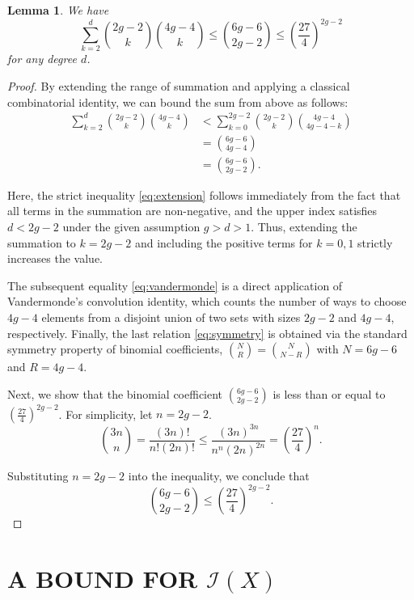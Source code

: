 \documentclass[11pt]{article}
\numberwithin{equation}{section}
\theoremstyle{plain}
\newtheorem{lemma}[theorem]{Lemma}
\begin{document}
\begin{lemma}\label{count}
We have
$$\sum_{k=2}^d \binom{2g-2}{k}\binom{4g-4}{k}\le
 \binom{6g-6}{2g-2}
 \le
\left( \frac{27}{4} \right)^{2g-2}$$
for any degree $d$.
\end{lemma}
\begin{proof}


By extending the range of summation and applying a classical combinatorial identity, we can bound the sum from above as follows:
\begin{align}
\sum_{k=2}^d \binom{2g-2}{k} \binom{4g-4}{k} 
&< \sum_{k=0}^{2g-2} \binom{2g-2}{k} \binom{4g-4}{4g-4-k} \label{eq:extension} \\
&= \binom{6g-6}{4g-4} \label{eq:vandermonde} \\
&= \binom{6g-6}{2g-2}. \label{eq:symmetry}
\end{align}

Here, the strict inequality \eqref{eq:extension} follows immediately from the fact that all terms in the summation are non-negative, and the upper index satisfies $d < 2g-2$ under the given assumption $g > d > 1$. 
Thus, extending the summation to $k = 2g-2$ and including the positive terms for $k=0,1$ strictly increases the value. 

The subsequent equality \eqref{eq:vandermonde} is a direct application of Vandermonde's convolution identity, which counts the number of ways to choose $4g-4$ elements from a disjoint union of two sets with sizes $2g-2$ and $4g-4$, respectively. 
Finally, the last relation \eqref{eq:symmetry} is obtained via the standard symmetry property of binomial coefficients, $\binom{N}{R} = \binom{N}{N-R}$ with $N = 6g-6$ and $R = 4g-4$.


Next, we show that the binomial coefficient $\binom{6g-6}{2g-2}$ is less than 
or equal to $\left( \frac{27}{4} \right)^{2g-2}$. 
For simplicity, let $n = 2g-2$. 
$$
\binom{3n}{n}
=
\frac{(3n)!}{n!(2n)!}
\le
\frac{(3n)^{3n}}{n^n(2n)^{2n}}
=
\left(\frac{27}{4}\right)^n.
$$

Substituting $n = 2g-2$ into the inequality, we conclude that
\begin{equation*}
\binom{6g-6}{2g-2} \le \left( \frac{27}{4} \right)^{2g-2}.
\end{equation*}
\end{proof}

\section{ A BOUND FOR $\mathcal{I}(X)$}
\end{document}
